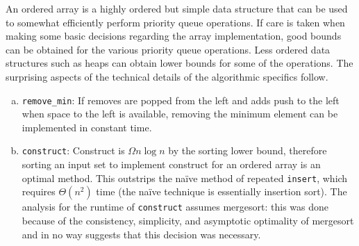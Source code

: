 
An ordered array is a highly ordered but simple data structure that can be used to somewhat efficiently perform priority queue operations.  If care is taken when making some basic decisions regarding the array implementation, good bounds can be obtained for the various priority queue operations.  Less ordered data structures such as heaps can obtain lower bounds for some of the operations.  The surprising aspects of the technical details of the algorithmic specifics follow.

\begin{enumerate}[a):]

\item \texttt{remove\_min}: If removes are popped from the left and adds push to the left when space to the left is available, removing the minimum element can be implemented in constant time.

\item \texttt{construct}: Construct is $\Omega{n \log n}$ by the sorting lower bound, therefore sorting an input set to implement construct for an ordered array is an optimal method.  This outstrips the naïve method of repeated \texttt{insert}, which requires $\Theta(n ^ 2)$ time (the naïve technique is essentially insertion sort).  The analysis for the runtime of \texttt{construct} assumes mergesort: this was done because of the consistency, simplicity, and asymptotic optimality of mergesort and in no way suggests that this decision was necessary.

\end{enumerate}

